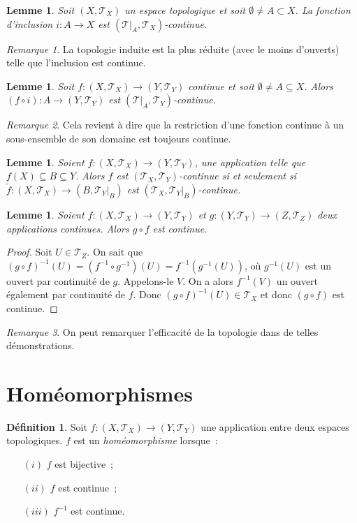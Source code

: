 \documentclass{report}
\newtheorem{lem}[thm]{Lemme}
\theoremstyle{definition}
\newtheorem{déf}[thm]{Définition}
\theoremstyle{remark}
\newtheorem*{rmq}{Remarque}
\newcommand{\restr}[2]{\left.#1\right|_{#2}}
\renewcommand{\top}{\mathcal T}
\begin{document}
		\begin{lem} Soit $(X, \top_X)$ un espace topologique et soit $\emptyset \neq A \subset X$. La fonction d'inclusion $i : A \to X$ est
		$(\restr \top A, \top_X)$-continue.
		\end{lem}

		\begin{rmq} La topologie induite est la plus réduite (avec le moins d'ouverts) telle que l'inclusion est continue.
		\end{rmq}

		\begin{lem} Soit $f : (X, \top_X) \to (Y, \top_Y)$ continue et soit $\emptyset \neq A \subseteq X$. Alors $(f \circ i) : A \to (Y, \top_Y)$
		est $(\restr \top A, \top_Y)$-continue.
		\end{lem}

		\begin{rmq} Cela revient à dire que la restriction d'une fonction continue à un sous-ensemble de son domaine est toujours continue.
		\end{rmq}

		\begin{lem} Soient $f : (X, \top_X) \to (Y, \top_Y)$, une application telle que $f(X) \subseteq B \subseteq Y$. Alors $f$ est $(\top_X, \top_Y)$-continue
		si et seulement si $\tilde f : (X, \top_X) \to (B, \restr {\top_Y} B)$ est $(\top_X, \restr {\top_Y}B)$-continue.
		\end{lem}

		\begin{lem} Soient $f : (X, \top_X) \to (Y, \top_Y)$ et $g : (Y, \top_Y) \to (Z, \top_Z)$ deux applications continues. Alors $g \circ f$ est continue.
		\end{lem}

		\begin{proof} Soit $U \in \top_Z$. On sait que $(g \circ f)^{-1}(U) = (f^{-1} \circ g^{-1})(U) = f^{-1}(g^{-1}(U))$, où $g^{-1}(U)$ est un ouvert par
		continuité de $g$. Appelons-le $V$. On a alors $f^{-1}(V)$ un ouvert également par continuité de $f$. Donc $(g \circ f)^{-1}(U) \in \top_X$ et donc
		$(g \circ f)$ est continue.
		\end{proof}

		\begin{rmq} On peut remarquer l'efficacité de la topologie dans de telles démonstrations.
		\end{rmq}

	\section{Homéomorphismes}
		\begin{déf} Soit $f : (X, \top_X) \to (Y, \top_Y)$ une application entre deux espaces topologiques. $f$ est un \textit{homéomorphisme} lorsque~:
		\begin{itemize}
			\item[$(i)$]   $f$ est bijective~;
			\item[$(ii)$]  $f$ est continue~;
			\item[$(iii)$] $f^{-1}$ est continue.
		\end{itemize}
		\end{déf}
\end{document}
